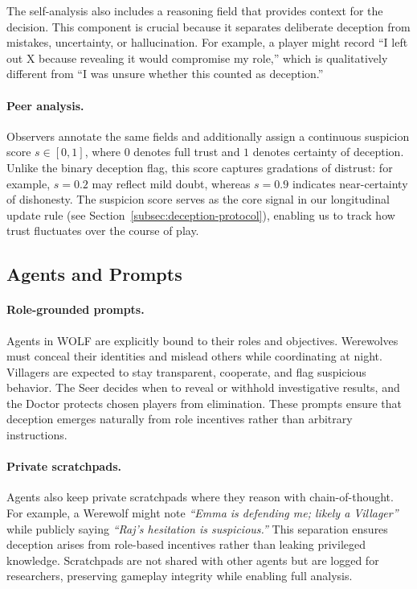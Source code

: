 \documentclass{article}
\begin{document}
The self-analysis also includes a reasoning field that provides context for the decision. 
This component is crucial because it separates deliberate deception from mistakes, uncertainty, or hallucination. 
For example, a player might record ``I left out X because revealing it would compromise my role,'' 
which is qualitatively different from ``I was unsure whether this counted as deception.''


\paragraph{Peer analysis.} Observers annotate the same fields and additionally assign a continuous suspicion score $s \in [0,1]$, where $0$ denotes full trust and $1$ denotes certainty of deception. Unlike the binary deception flag, this score captures gradations of distrust: for example, $s=0.2$ may reflect mild doubt, whereas $s=0.9$ indicates near-certainty of dishonesty. The suspicion score serves as the core signal in our longitudinal update rule (see Section~\ref{subsec:deception-protocol}), enabling us to track how trust fluctuates over the course of play.

\subsection{Agents and Prompts}
\paragraph{Role-grounded prompts.} 
Agents in WOLF are explicitly bound to their roles and objectives. Werewolves must conceal their identities and mislead others while coordinating at night. Villagers are expected to stay transparent, cooperate, and flag suspicious behavior. The Seer decides when to reveal or withhold investigative results, and the Doctor protects chosen players from elimination. These prompts ensure that deception emerges naturally from role incentives rather than arbitrary instructions.

\paragraph{Private scratchpads.} 
Agents also keep private scratchpads where they reason with chain-of-thought. For example, a Werewolf might note \textit{``Emma is defending me; likely a Villager''} while publicly saying \textit{``Raj’s hesitation is suspicious.''} This separation ensures deception arises from role-based incentives rather than leaking privileged knowledge. Scratchpads are not shared with other agents but are logged for researchers, preserving gameplay integrity while enabling full analysis.
\end{document}
